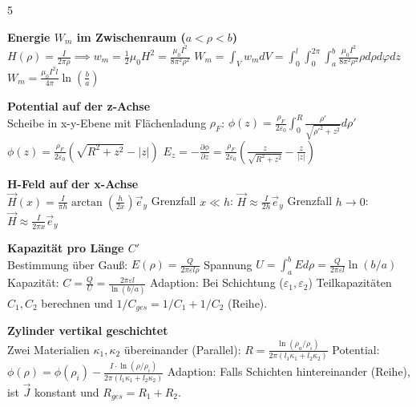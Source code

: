 \documentclass[a4paper, 2pt, landscape]{extarticle}
\begin{document}
\begin{multicols*}{5}
\begin{tcolorbox}[title={Magnetostatik: Koaxialkabel Energie (Blatt 6)}, colback=white, colframe=black]
\textbf{Energie $W_m$ im Zwischenraum ($a < \rho < b$)} \\
$H(\rho) = \frac{I}{2\pi \rho} \implies w_m = \frac{1}{2} \mu_0 H^2 = \frac{\mu_0 I^2}{8\pi^2 \rho^2}$
$W_m = \int_V w_m dV = \int_{0}^{l} \int_{0}^{2\pi} \int_{a}^{b} \frac{\mu_0 I^2}{8\pi^2 \rho^2} \rho d\rho d\varphi dz$
$W_m = \frac{\mu_0 I^2 l}{4\pi} \ln\left(\frac{b}{a}\right)$
\end{tcolorbox}

\begin{tcolorbox}[title={Potential: Geladene Kreisscheibe (Blatt 1)}, colback=white, colframe=black]
\textbf{Potential auf der z-Achse} \\
Scheibe in x-y-Ebene mit Flächenladung $\rho_F$:
$\phi(z) = \frac{\rho_F}{2\varepsilon_0} \int_{0}^{R} \frac{\rho'}{\sqrt{\rho'^2 + z^2}} d\rho'$
$\phi(z) = \frac{\rho_F}{2\varepsilon_0} (\sqrt{R^2 + z^2} - |z|)$
$E_z = -\frac{\partial \phi}{\partial z} = \frac{\rho_F}{2\varepsilon_0} (\frac{z}{\sqrt{R^2 + z^2}} - \frac{z}{|z|})$
\end{tcolorbox}

\begin{tcolorbox}[title={Magnetostatik: Endliche Stromschiene (Blatt 8)}, colback=white, colframe=black]
\textbf{H-Feld auf der x-Achse} \\
$\vec{H}(x) = \frac{I}{\pi h} \arctan\left(\frac{h}{2x}\right) \vec{e}_y$
Grenzfall $x \ll h$: $\vec{H} \approx \frac{I}{2h} \vec{e}_y$
Grenzfall $h \to 0$: $\vec{H} \approx \frac{I}{2\pi x} \vec{e}_y$
\end{tcolorbox}

\begin{tcolorbox}[title={Elektrostatik: Koaxialkabel Kapazität (Blatt 4)}, colback=white, colframe=black]
\textbf{Kapazität pro Länge $C'$} \\
Bestimmung über Gauß: $E(\rho) = \frac{Q}{2\pi \varepsilon l \rho}$
Spannung $U = \int_{a}^{b} E d\rho = \frac{Q}{2\pi \varepsilon l} \ln(b/a)$
Kapazität: $C = \frac{Q}{U} = \frac{2\pi \varepsilon l}{\ln(b/a)}$
Adaption: Bei Schichtung ($\varepsilon_1, \varepsilon_2$) Teilkapazitäten 
$C_1, C_2$ berechnen und $1/C_{ges} = 1/C_1 + 1/C_2$ (Reihe).
\end{tcolorbox}

\begin{tcolorbox}[title={Strömungsfeld: Geschichtetes Medium (Blatt 5)}, colback=white, colframe=black]
\textbf{Zylinder vertikal geschichtet} \\
Zwei Materialien $\kappa_1, \kappa_2$ übereinander (Parallel):
$R = \frac{\ln(\rho_a/\rho_i)}{2\pi (l_1 \kappa_1 + l_2 \kappa_2)}$
Potential: $\phi(\rho) = \phi(\rho_i) - \frac{I \cdot \ln(\rho/\rho_i)}{2\pi (l_1 \kappa_1 + l_2 \kappa_2)}$
Adaption: Falls Schichten hintereinander (Reihe), 
ist $\vec{J}$ konstant und $R_{ges} = R_1 + R_2$.
\end{tcolorbox}


\end{multicols*}
\end{document}
